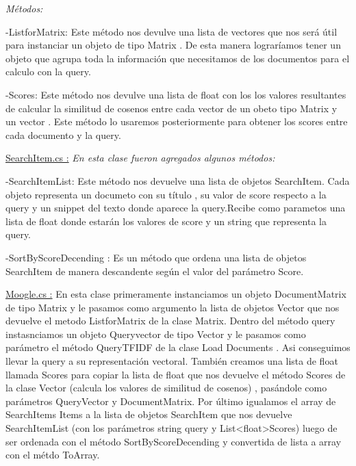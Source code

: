 \documentclass{article}
\begin{document}
\begin{center}
\begin{flushleft}
		\textit{ \large {Métodos:}} 
		
		\vspace{0.5em}-ListforMatrix:
		Este método nos devulve una lista de vectores que nos será útil para instanciar un objeto de tipo Matrix . De esta manera lograríamos tener un objeto que agrupa toda la información que necesitamos de los documentos para el calculo con la query.\vspace{0.5em}
		
		-Scores:
		Este método nos devulve una lista de float con los los valores resultantes de calcular la similitud de cosenos entre cada vector de un obeto tipo Matrix y un vector . Este método lo usaremos posteriormente para obtener los scores entre cada documento y la query. \vspace{2em}
		
		\underline{SearchItem.cs :}
			\textit{ \large {En esta clase fueron agregados algunos métodos:}}\vspace{1em}
			 
		-SearchItemList:
		Este método nos devuelve una lista de objetos SearchItem. Cada objeto representa un documeto con su título , su valor de score respecto a la query y un snippet del texto donde aparece la query.Recibe como parametos una lista de float donde estarán los valores de score y un string que representa la query.  \vspace{0.5em}
		
		-SortByScoreDecending :
		Es un método que ordena una lista de objetos SearchItem de manera descandente según el valor del parámetro Score.\vspace{0.5em}
		
		\vspace{4em}\underline{Moogle.cs :}
		En esta clase primeramente instanciamos un objeto DocumentMatrix de tipo Matrix y le pasamos como argumento la lista de objetos Vector que nos devuelve el metodo ListforMatrix de la clase Matrix.
		Dentro del método query instasnciamos un objeto Queryvector de tipo Vector y le pasamos como parámetro el método QueryTFIDF de la clase Load Documents . Asi conseguimos llevar la query a su representación vectoral. 
		También creamos  una lista de float llamada Scores para copiar la lista de float que nos devuelve el método Scores de la clase Vector (calcula los valores de similitud de cosenos)  , pasándole como parámetros QueryVector y DocumentMatrix.
		Por último igualamos el array de SearchItems Items a la lista de objetos SearchItem que nos devuelve SearchItemList (con los parámetros string query y List<float>Scores) luego de ser ordenada con el método SortByScoreDecending y convertida de lista a array con el métdo ToArray.
		

\end{flushleft}
\end{center}
\end{document}
